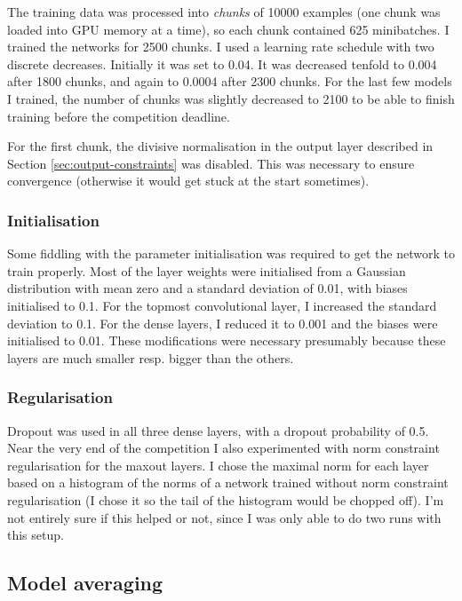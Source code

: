 \documentclass[a4paper,10pt]{article}
\begin{document}
The training data was processed into \textit{chunks} of 10000 examples (one chunk was loaded into GPU memory at a time), so each chunk contained 625 minibatches. I trained the networks for 2500 chunks. I used a learning rate schedule with two discrete decreases. Initially it was set to 0.04. It was decreased tenfold to 0.004 after 1800 chunks, and again to 0.0004 after 2300 chunks. For the last few models I trained, the number of chunks was slightly decreased to 2100 to be able to finish training before the competition deadline.

For the first chunk, the divisive normalisation in the output layer described in Section \ref{sec:output-constraints} was disabled. This was necessary to ensure convergence (otherwise it would get stuck at the start sometimes).

\subsubsection{Initialisation}

Some fiddling with the parameter initialisation was required to get the network to train properly. Most of the layer weights were initialised from a Gaussian distribution with mean zero and a standard deviation of 0.01, with biases initialised to 0.1. For the topmost convolutional layer, I increased the standard deviation to 0.1. For the dense layers, I reduced it to 0.001 and the biases were initialised to 0.01. These modifications were necessary presumably because these layers are much smaller resp. bigger than the others.

\subsubsection{Regularisation}
Dropout was used in all three dense layers, with a dropout probability of 0.5. Near the very end of the competition I also experimented with norm constraint regularisation for the maxout layers. I chose the maximal norm for each layer based on a histogram of the norms of a network trained without norm constraint regularisation (I chose it so the tail of the histogram would be chopped off). I'm not entirely sure if this helped or not, since I was only able to do two runs with this setup.

\subsection{Model averaging}
\label{sec:model-averaging}
\end{document}
